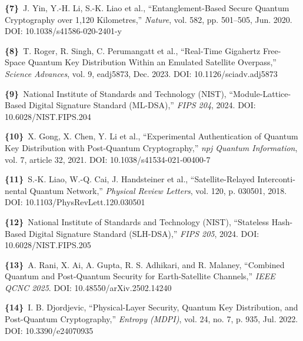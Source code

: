 \documentclass[a4paper,14pt]{extreport}
\begin{document}
\begin{latin}
\begin{flushleft}
\vspace{2pt}

\noindent\textbf{\{7\}}~J. Yin, Y.-H. Li, S.-K. Liao et al., ``Entanglement-Based Secure Quantum Cryptography over 1,120 Kilometres,'' \textit{Nature}, vol. 582, pp. 501--505, Jun. 2020. DOI: 10.1038/s41586-020-2401-y

\vspace{2pt}

\noindent\textbf{\{8\}}~T. Roger, R. Singh, C. Perumangatt et al., ``Real-Time Gigahertz Free-Space Quantum Key Distribution Within an Emulated Satellite Overpass,'' \textit{Science Advances}, vol. 9, eadj5873, Dec. 2023. DOI: 10.1126/sciadv.adj5873

\vspace{2pt}

\noindent\textbf{\{9\}}~National Institute of Standards and Technology (NIST), ``Module-Lattice-Based Digital Signature Standard (ML-DSA),'' \textit{FIPS 204}, 2024. DOI: 10.6028/NIST.FIPS.204

\vspace{2pt}

\noindent\textbf{\{10\}}~X. Gong, X. Chen, Y. Li et al., ``Experimental Authentication of Quantum Key Distribution with Post-Quantum Cryptography,'' \textit{npj Quantum Information}, vol. 7, article 32, 2021. DOI: 10.1038/s41534-021-00400-7

\vspace{2pt}

\noindent\textbf{\{11\}}~S.-K. Liao, W.-Q. Cai, J. Handsteiner et al., ``Satellite-Relayed Intercontinental Quantum Network,'' \textit{Physical Review Letters}, vol. 120, p. 030501, 2018. DOI: 10.1103/PhysRevLett.120.030501

\vspace{2pt}

\noindent\textbf{\{12\}}~National Institute of Standards and Technology (NIST), ``Stateless Hash-Based Digital Signature Standard (SLH-DSA),'' \textit{FIPS 205}, 2024. DOI: 10.6028/NIST.FIPS.205

\vspace{2pt}

\noindent\textbf{\{13\}}~A. Rani, X. Ai, A. Gupta, R. S. Adhikari, and R. Malaney, ``Combined Quantum and Post-Quantum Security for Earth-Satellite Channels,'' \textit{IEEE QCNC 2025}. DOI: 10.48550/arXiv.2502.14240

\vspace{2pt}

\noindent\textbf{\{14\}}~I. B. Djordjevic, ``Physical-Layer Security, Quantum Key Distribution, and Post-Quantum Cryptography,'' \textit{Entropy (MDPI)}, vol. 24, no. 7, p. 935, Jul. 2022. DOI: 10.3390/e24070935


\end{flushleft}
\end{latin}
\end{document}
